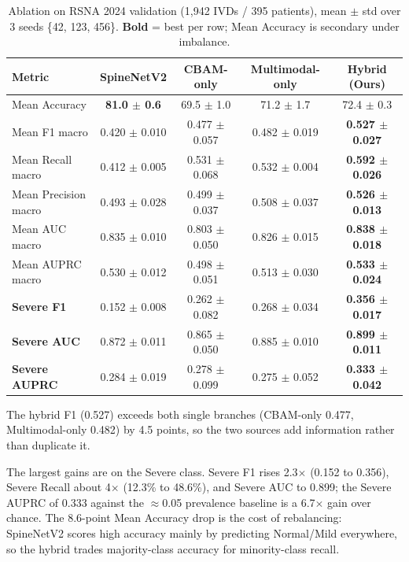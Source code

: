 \documentclass[runningheads]{llncs}
\newcommand{\best}[1]{\textcolor{best}{\textbf{#1}}}
\begin{document}
\begin{table}[ht]
\centering
\caption{Ablation on RSNA 2024 validation (1{,}942 IVDs / 395 patients), mean $\pm$ std over 3 seeds \{42, 123, 456\}. \textbf{Bold} = best per row; Mean Accuracy is secondary under imbalance.}
\label{tab:main}
\footnotesize
\setlength{\tabcolsep}{2pt}
\begin{tabular}{@{}lcccc@{}}
\toprule
Metric & SpineNetV2 & CBAM-only & Multimodal-only & Hybrid (Ours) \\
\midrule
Mean Accuracy        & \best{81.0 $\pm$ 0.6} & 69.5 $\pm$ 1.0 & 71.2 $\pm$ 1.7 & 72.4 $\pm$ 0.3 \\
Mean F1 macro        & 0.420 $\pm$ 0.010 & 0.477 $\pm$ 0.057 & 0.482 $\pm$ 0.019 & \best{0.527 $\pm$ 0.027} \\
Mean Recall macro    & 0.412 $\pm$ 0.005 & 0.531 $\pm$ 0.068 & 0.532 $\pm$ 0.004 & \best{0.592 $\pm$ 0.026} \\
Mean Precision macro & 0.493 $\pm$ 0.028 & 0.499 $\pm$ 0.037 & 0.508 $\pm$ 0.037 & \best{0.526 $\pm$ 0.013} \\
Mean AUC macro       & 0.835 $\pm$ 0.010 & 0.803 $\pm$ 0.050 & 0.826 $\pm$ 0.015 & \best{0.838 $\pm$ 0.018} \\
Mean AUPRC macro     & 0.530 $\pm$ 0.012 & 0.498 $\pm$ 0.051 & 0.513 $\pm$ 0.030 & \best{0.533 $\pm$ 0.024} \\
\midrule
\textbf{Severe F1}    & 0.152 $\pm$ 0.008 & 0.262 $\pm$ 0.082 & 0.268 $\pm$ 0.034 & \best{0.356 $\pm$ 0.017} \\
\textbf{Severe AUC}   & 0.872 $\pm$ 0.011 & 0.865 $\pm$ 0.050 & 0.885 $\pm$ 0.010 & \best{0.899 $\pm$ 0.011} \\
\textbf{Severe AUPRC} & 0.284 $\pm$ 0.019 & 0.278 $\pm$ 0.099 & 0.275 $\pm$ 0.052 & \best{0.333 $\pm$ 0.042} \\
\bottomrule
\end{tabular}
\end{table}

The hybrid F1 (0.527) exceeds both single branches (CBAM-only 0.477, Multimodal-only 0.482) by 4.5 points, so the two sources add information rather than duplicate it.

The largest gains are on the Severe class. Severe F1 rises 2.3$\times$ (0.152 to 0.356), Severe Recall about 4$\times$ (12.3\% to 48.6\%), and Severe AUC to 0.899; the Severe AUPRC of 0.333 against the $\approx$0.05 prevalence baseline is a 6.7$\times$ gain over chance. The 8.6-point Mean Accuracy drop is the cost of rebalancing: SpineNetV2 scores high accuracy mainly by predicting Normal/Mild everywhere, so the hybrid trades majority-class accuracy for minority-class recall.
\end{document}

